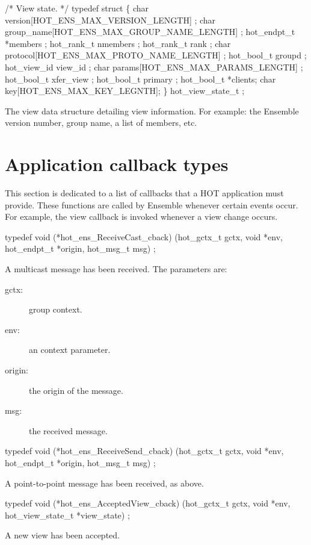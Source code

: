 \documentclass[11pt]{article}
\begin{document}
\begin{codebox}
/* View state.
 */
typedef struct \{
  char version[HOT_ENS_MAX_VERSION_LENGTH] ;
  char group_name[HOT_ENS_MAX_GROUP_NAME_LENGTH] ;
  hot_endpt_t *members ;
  hot_rank_t nmembers ;
  hot_rank_t rank ;
  char protocol[HOT_ENS_MAX_PROTO_NAME_LENGTH] ;
  hot_bool_t groupd ;
  hot_view_id view_id ;
  char params[HOT_ENS_MAX_PARAMS_LENGTH] ;
  hot_bool_t xfer_view ;
  hot_bool_t primary ;
  hot_bool_t *clients;
  char key[HOT_ENS_MAX_KEY_LEGNTH];
\} hot_view_state_t ;
\end{codebox}
The view data structure detailing view information. For example: the
Ensemble version number, group name, a list of members, etc. 


\section{Application callback types}

This section is dedicated to a list of callbacks that a HOT
application must provide. These functions are called by Ensemble
whenever certain events occur. For example, the view callback is
invoked whenever a view change occurs.

\begin{codebox}
typedef void (*hot_ens_ReceiveCast_cback)
    (hot_gctx_t gctx, void *env, hot_endpt_t *origin, hot_msg_t msg) ;
\end{codebox}
A multicast message has been received. The parameters are: 
\begin{description}
\item[gctx:] group context.
\item[env:] an context parameter.
\item[origin:] the origin of the message.
\item[msg:] the received message.
\end{description}

\begin{codebox}
typedef void (*hot_ens_ReceiveSend_cback)
    (hot_gctx_t gctx, void *env, hot_endpt_t *origin, hot_msg_t msg) ;
\end{codebox}
A point-to-point message has been received, as above. 

\begin{codebox}
typedef void (*hot_ens_AcceptedView_cback)
    (hot_gctx_t gctx, void *env, hot_view_state_t *view_state) ;
\end{codebox}
A new view has been accepted. 
\end{document}
